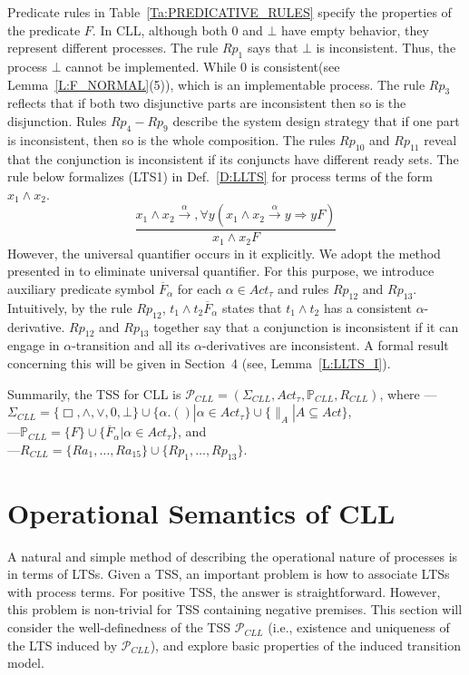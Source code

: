 \documentclass{elsarticle}
\theoremstyle{plain}
\theoremstyle{definition}
\begin{document}
Predicate rules in Table~\ref{Ta:PREDICATIVE_RULES} specify the properties of the predicate $F$.
In CLL, although both $0$ and $\bot$ have empty behavior, they represent different processes.
The rule $Rp_1$ says that $\bot$ is inconsistent.
Thus, the process $\bot$ cannot be implemented.
While $0$ is consistent(see Lemma~\ref{L:F_NORMAL}(5)), which is an implementable process.
The rule $Rp_3$ reflects that if both two disjunctive parts are inconsistent then so is the disjunction.
Rules $Rp_4-Rp_9$ describe the system design strategy that if one part is inconsistent, then so is the whole composition.
The rules $Rp_{10}$ and $Rp_{11}$ reveal that the conjunction is inconsistent if its conjuncts have different ready sets.
The rule below formalizes (LTS1) in Def.~\ref{D:LLTS} for process terms of the form $x_1 \wedge x_2$.
\[ \frac{x_1 \wedge x_2 \stackrel{\alpha}{\longrightarrow}, \forall y(x_1\wedge x_2 \stackrel{\alpha}{\longrightarrow}y \Rightarrow yF)}{x_1 \wedge x_2F}\]
However, the universal quantifier occurs in it explicitly.
We adopt the method presented in \cite{Verhoef95} to eliminate universal quantifier.
For this purpose, we introduce auxiliary predicate symbol $\overline{F}_{\alpha}$ for each $\alpha \in Act_{\tau}$ and rules $Rp_{12}$ and $Rp_{13}$.
Intuitively, by the rule $Rp_{12}$, $t_1 \wedge t_2 \overline{F}_{\alpha}$ states that $t_1 \wedge t_2$ has a consistent $\alpha$-derivative.
$Rp_{12}$ and $Rp_{13}$ together say that a conjunction is inconsistent if it can engage in $\alpha$-transition and all its $\alpha$-derivatives are inconsistent. A formal result concerning this will be given in Section~4 (see, Lemma~\ref{L:LLTS_I}).

Summarily, the TSS for CLL is $\mathcal{P}_{CLL} =(\Sigma_{CLL},Act_{\tau},\mathbb{P}_{CLL},R_{CLL})$, where ---$\Sigma_{CLL} = \{ \Box,\wedge,\vee,0,\bot\}\cup\{\alpha.()|\alpha \in Act_\tau\}\cup\{\parallel_A|A\subseteq Act\}$,\\
---$\mathbb{P}_{CLL}=\{F\} \cup \{\overline{F}_\alpha|\alpha \in Act_\tau\}$, and \\
---$R_{CLL}=\{Ra_1, \dots, Ra_{15}\}\cup\{Rp_1, \dots ,Rp_{13}\}$.



\section{Operational Semantics of CLL}
A natural and simple method of describing the operational nature of processes is in terms of LTSs. Given a TSS, an important problem is how to associate LTSs with process terms. For positive TSS, the answer is straightforward.
However, this problem is non-trivial for TSS containing negative premises. This section will consider the well-definedness of the TSS ${\mathcal P}_{CLL}$ (i.e., existence and uniqueness of the LTS induced by ${\mathcal P}_{CLL}$), and explore basic properties of the induced transition model.
\end{document}
